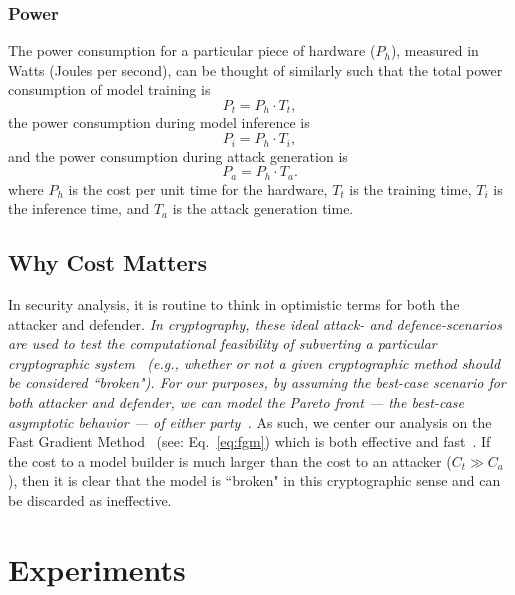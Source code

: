 \documentclass[conference]{IEEEtran}
\newcommand{\cm}[1]{\textit{{\color{blue}#1}}}
\begin{document}
\subsubsection{Power}
The power consumption for a particular piece of hardware ($P_h$), measured in Watts (Joules per second), can be thought of similarly such that the total power consumption of model training is
$$
    P_t = P_h \cdot T_t,
    \label{eq:power_training}
$$
the power consumption during model inference is
$$
    P_i = P_h \cdot T_i,
    \label{eq:power_inference}
$$
and the power consumption during attack generation is
$$
    P_a = P_h \cdot T_a.
    \label{eq:power_attack}
$$
where $P_h$ is the cost per unit time for the hardware, $T_t$ is the training time, $T_i$ is the inference time, and $T_a$ is the attack generation time.

\subsection{Why Cost Matters}

 In security analysis, it is  routine to think in optimistic terms for both the attacker and defender. \cm{In cryptography, these ideal attack- and defence-scenarios are used to test the computational feasibility of subverting a particular cryptographic system~\cite{kamal2017study,leurent2020sha} (\textit{e.g.}, whether or not a given cryptographic method should be considered ``broken"). For our purposes, by assuming the best-case scenario for both attacker and defender, we can model the Pareto front --- the best-case asymptotic behavior --- of either party~\cite{zitzler2008quality}.}
As such, we center our analysis on the Fast Gradient Method~\cite{fgm} (see: Eq.~\ref{eq:fgm}) which is both effective and fast~\cite{meyers}. If the cost to a model builder is much larger than the cost to an attacker ($C_t \gg C_a$), then it is  clear that the model is ``broken" in this cryptographic sense and can be discarded as ineffective. 





\section{Experiments}
\label{experiments}
\end{document}
